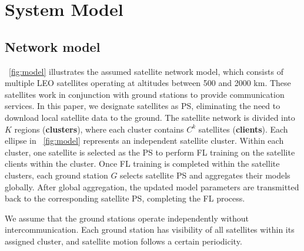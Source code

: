 \section{System Model}\label{sec:model}




\subsection{Network model}
\figurename~\ref{fig:model} illustrates the assumed satellite network model, which consists of multiple LEO satellites operating at altitudes between 500 and 2000 km. These satellites work in conjunction with ground stations to provide communication services. In this paper, we designate satellites as PS, eliminating the need to download local satellite data to the ground.
The satellite network is divided into $K$ regions (\textbf{clusters}), where each cluster contains $C^k$ satellites (\textbf{clients}). Each ellipse in \figurename~\ref{fig:model} represents an independent satellite cluster. Within each cluster, one satellite is selected as the PS to perform FL training on the satellite clients within the cluster. Once FL training is completed within the satellite clusters, each ground station $G$ selects satellite PS and aggregates their models globally. After global aggregation, the updated model parameters are transmitted back to the corresponding satellite PS, completing the FL process.


We assume that the ground stations operate independently without intercommunication. Each ground station has visibility of all satellites within its assigned cluster, and satellite motion follows a certain periodicity. %





